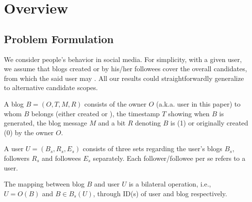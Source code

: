 \section{\sys{} Overview}
\label{sec:overv}

\subsection{Problem Formulation}

We consider people's \retg{} behavior in social media.
For simplicity, with a given user, we assume that blogs created or \retd{} by his/her followees cover the overall candidates, from which the said user may \ret{}.
All our results could straightforwardly generalize to alternative candidate scopes.

\begin{definition}
\label{def:blog}
A blog $B = (O, T, M, R)$ consists of the owner $O$ (a.k.a. user in this paper) to whom $B$ belongs (either created or \retd{}), the timestamp $T$ showing when $B$ is generated, the blog message $M$ and a bit $R$ denoting $B$ is \retd{} (1) or originally created (0) by the owner $O$.
\end{definition}

\begin{comment}
\begin{definition}
A blog $B = (O, T, M, C)$ consists of the owner $O$ to whom $B$ belongs (either created or \retd{}), the timestamp $T$ showing when $B$ is generated, the blog message $M$ and a set of counters $C_s(B) = \{\#comment,\ \#like,\ \#\ret{}\}$ regarding the number of being commented, liked, and \retd{}.
\end{definition}
\end{comment}

\begin{definition}
\label{def:user}
A user $U = (B_s, R_s, E_s)$ consists of three sets regarding the user's blogs $B_s$, followers $R_s$ and followees $E_s$ separately.
Each follower/followee per se refers to a user.
\end{definition}

The mapping between blog $B$ and user $U$ is a bilateral operation, i.e., $U = O(B)$ and $B \in B_s(U)$, through ID(s) of user and blog respectively.

